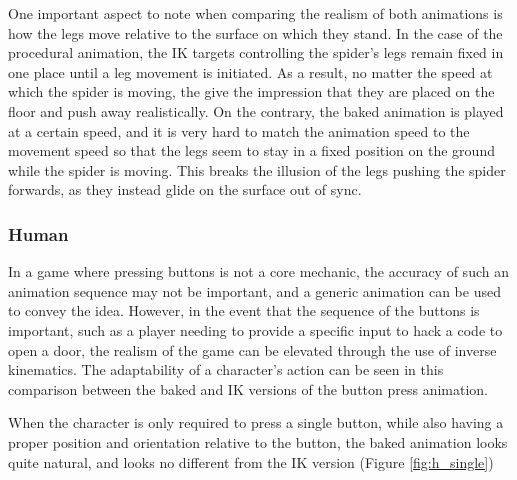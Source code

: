 One important aspect to note when comparing the realism of both animations is
how the legs move relative to the surface on which they stand. In the case of
the procedural animation, the IK targets controlling the spider's legs remain
fixed in one place until a leg movement is initiated. As a result, no matter the
speed at which the spider is moving, the give the impression that they are
placed on the floor and push away realistically. On the contrary, the baked
animation is played at a certain speed, and it is very hard to match the
animation speed to the movement speed so that the legs seem to stay in a fixed
position on the ground while the spider is moving. This breaks the illusion of
the legs pushing the spider forwards, as they instead glide on the surface out
of sync.

\subsubsection{Human}
In a game where pressing buttons is not a core mechanic, the accuracy of such an
animation sequence may not be important, and a generic animation can be used to
convey the idea. However, in the event that the sequence of the buttons is
important, such as a player needing to provide a specific input to hack a code
to open a door, the realism of the game can be elevated through the use of
inverse kinematics. The adaptability of a character's action can be seen in this
comparison between the baked and IK versions of the button press animation.

When the character is only required to press a single button, while also having
a proper position and orientation relative to the button, the baked animation
looks quite natural, and looks no different from the IK version (Figure
\ref{fig:h_single})

